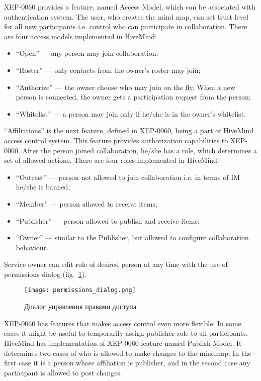 XEP-0060 provides a feature, named Access Model, which can be associated with
authentication system. The user, who creates the mind map, can set trust level
for all new participants i.e. control who can participate in collaboration.
There are four access models implemented in HiveMind:
\begin{itemize}
\item ``Open'' --- any person may join collaboration;
\item ``Roster'' --- only contacts from the owner’s roster may join;
\item ``Authorize'' --- the owner choose who may join on the fly. When a new
  person is connected, the owner gets a participation request from the person;
\item ``Whitelist'' --- a person may join only if he/she is in the owner’s
  whitelist.
\end{itemize}

``Affiliations'' is the next feature, defined in XEP-0060, being a part of
HiveMind access control system. This feature provides authorization capabilities
to XEP-0060. After the person joined collaboration, he/she has a role, which
determines a set of allowed actions. There are four roles implemented in
HiveMind:
\begin{itemize}
\item ``Outcast'' --- person not allowed to join collaboration i.e. in terms of
  IM he/she is banned;
\item ``Member'' --- person allowed to receive items;
\item ``Publisher'' --- person allowed to publish and receive items;
\item ``Owner'' --- similar to the Publisher, but allowed to configure
  collaboration behaviour.
\end{itemize}
Service owner can edit role of desired person at any time with the use of
permissions dialog (fig.~\ref{img:permissions_dialog}).

\begin{figure}[b] 
  \centering
  \texttt{[image: permissions\_dialog.png]}
  \caption{Диалог управления правами доступа}
  \label{img:permissions_dialog}
\end{figure}

XEP-0060 has features that makes access control even more flexible. In some
cases it might be useful to temporarily assign publisher role to all
participants. HiveMind has implementation of XEP-0060 feature named Publish
Model. It determines two cases of who is allowed to make changes to the
mindmap. In the first case it is a person whose affiliation is publisher, and in
the second case any participant is allowed to post changes.

